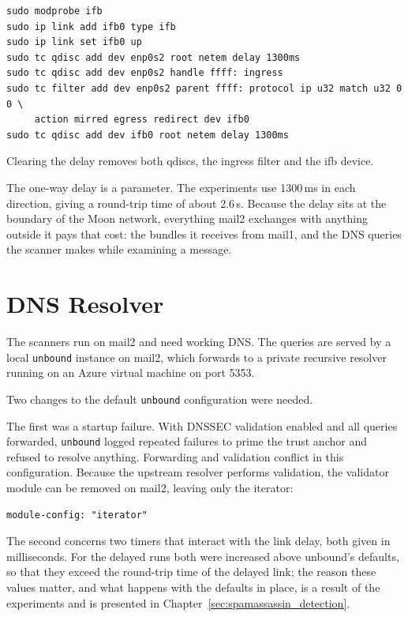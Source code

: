 \begin{lstlisting}
sudo modprobe ifb
sudo ip link add ifb0 type ifb
sudo ip link set ifb0 up
sudo tc qdisc add dev enp0s2 root netem delay 1300ms
sudo tc qdisc add dev enp0s2 handle ffff: ingress
sudo tc filter add dev enp0s2 parent ffff: protocol ip u32 match u32 0 0 \
     action mirred egress redirect dev ifb0
sudo tc qdisc add dev ifb0 root netem delay 1300ms
\end{lstlisting}

Clearing the delay removes both qdiscs, the ingress filter and the ifb device.

The one-way delay is a parameter. The experiments use 1300\,ms in each direction,
giving a round-trip time of about 2.6\,s. Because the delay sits at the boundary of
the Moon network, everything mail2 exchanges with anything outside it pays that
cost: the bundles it receives from mail1, and the DNS queries the scanner makes
while examining a message.

\section{DNS Resolver}

The scanners run on mail2 and need working DNS. The queries are served by a local
\texttt{unbound} instance on mail2, which forwards to a private recursive resolver
running on an Azure virtual machine on port 5353.

Two changes to the default \texttt{unbound} configuration were needed.

The first was a startup failure. With DNSSEC validation enabled and all queries
forwarded, \texttt{unbound} logged repeated failures to prime the trust anchor and
refused to resolve anything. Forwarding and validation conflict in this
configuration. Because the upstream resolver performs validation, the validator
module can be removed on mail2, leaving only the iterator:

\begin{lstlisting}
module-config: "iterator"
\end{lstlisting}


The second concerns two timers that interact with the link delay, both given in milliseconds. For the delayed runs both were increased above unbound's defaults, so that they exceed the round-trip time of the delayed link; the reason these values matter, and what happens with the defaults in place, is a result of the experiments and is presented in Chapter~\ref{sec:spamassassin_detection}.

